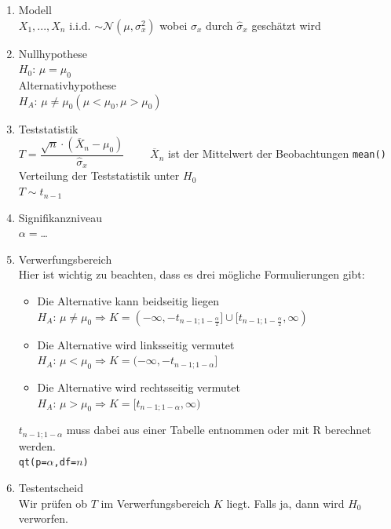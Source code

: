 \begin{enumerate}
  \item Modell \\
	  $X_1,...,X_n$ \acs{i.i.d.} $\sim\mathcal{N}(\mu, \sigma_x^2)$ 
	wobei $\sigma_x$ durch $\hat{\sigma}_x$ geschätzt wird
  \item Nullhypothese \\
       	$H_0$: $ \mu=\mu_0$ \\
	Alternativhypothese \\
	$H_A$: $ \mu \neq \mu_0 (\mu < \mu_0, \mu > \mu_0)$
  \item Teststatistik \\
	  $T=\dfrac{\sqrt{n}\cdot(\overline{X}_n-\mu_0)}{\hat{\sigma}_x}
      \qquad $ $\overline{X}_n$ ist der Mittelwert der Beobachtungen
	  \verb!mean()!\\
	  Verteilung der Teststatistik unter $H_0$\\
	  $T \sim t_{n-1}$
  \item Signifikanzniveau \\
        $\alpha= $\dots
  \item Verwerfungsbereich \\
	Hier ist wichtig zu beachten, dass es drei mögliche Formulierungen
	gibt:
	\begin{itemize}
		\item	Die Alternative kann beidseitig liegen \\
		$H_A$: $\mu\neq\mu_0 \Rightarrow 
	 	K=(-\infty, -t_{n-1;1-\frac{\alpha}{2}}]
		\cup [t_{n-1;1-\frac{\alpha}{2}}, \infty)$ \\
		\item Die Alternative wird linksseitig vermutet \\
		$H_A$: $\mu<\mu_0    \Rightarrow 
		K=(-\infty, -t_{n-1;1-\alpha}] $ \\
		\item Die Alternative wird rechtsseitig vermutet \\
		$H_A$: $\mu>\mu_0    \Rightarrow 
		K=[t_{n-1;1-\alpha}, \infty)$ \\
	\end{itemize}
    $t_{n-1;1-\alpha}$ muss dabei aus einer Tabelle entnommen oder mit R 
    berechnet werden. \\
    \verb!qt(p=!$\alpha$\verb!,df=!$n$\verb!)!
  \item Testentscheid \\
	Wir prüfen ob $T$ im Verwerfungsbereich $K$ liegt. Falls ja, 
	dann wird $H_0$ verworfen.
\end{enumerate}

